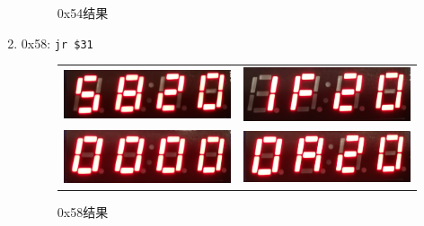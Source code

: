 \begin{enumerate}
\begin{figure}[H]
    \caption{0x54结果}
    \end{figure}
    \item 0x58: \verb'jr $31'
    \begin{figure}[H]
    \centering
    \begin{tabular}{cc}
    \includegraphics[width=0.3\linewidth]{fig/Implementation/0x58_00.jpg}&
    \includegraphics[width=0.3\linewidth]{fig/Implementation/0x58_01.jpg}\\
    \includegraphics[width=0.3\linewidth]{fig/Implementation/0x58_10.jpg}&
    \includegraphics[width=0.3\linewidth]{fig/Implementation/0x58_11.jpg}
    \end{tabular}
    \caption{0x58结果}
    \end{figure}
\end{enumerate}